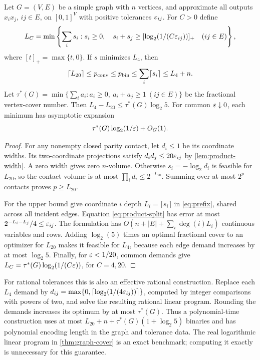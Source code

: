 \begin{theorem}\label{thm:graph-cover}
Let $G=(V,E)$ be a simple graph with $n$ vertices, and approximate all
outputs $x_ix_j$, $ij\in E$, on $[0,1]^V$ with positive tolerances
$\varepsilon_{ij}$. For $C>0$ define
\[
 L_C=\min\left\{\sum_i s_i:s_i\ge0,\quad
 s_i+s_j\ge[\log_2(1/(C\varepsilon_{ij}))]_+\quad(ij\in E)\right\},
\]
where $[t]_+=\max\{t,0\}$. If $s$ minimizes $L_4$, then
\begin{equation}\label{eq:graph-finite}
 \lceil L_{20}\rceil\le p_{\mathrm{conv}}\le p_{\mathrm{bin}}
 \le\sum_i\lceil s_i\rceil\le L_4+n.
\end{equation}
Let $\tau^*(G)=\min\{\sum_i a_i:a_i\ge0,\ a_i+a_j\ge1\ (ij\in E)\}$
be the fractional vertex-cover number. Then
$L_4-L_{20}\le\tau^*(G)\log_2 5$.
For common $\varepsilon\downarrow0$, each minimum has asymptotic expansion
\[
 \tau^*(G)\log_2(1/\varepsilon)+O_G(1).
\]
\end{theorem}
\begin{proof}
For any nonempty closed parity contact, let $d_i\le1$ be its coordinate
widths. Its two-coordinate projections satisfy
$d_id_j\le20\varepsilon_{ij}$ by \cref{lem:product-width}. A zero width gives
zero $n$-volume. Otherwise $s_i=-\log_2d_i$ is feasible for $L_{20}$,
so the contact volume is at most $\prod_i d_i\le2^{-L_{20}}$.
Summing over at most $2^p$ contacts proves $p\ge L_{20}$.

For the upper bound give coordinate $i$ depth $L_i=\lceil s_i\rceil$
in \eqref{eq:prefix}, shared across all incident edges. Equation
\eqref{eq:product-split} has error at most
$2^{-L_i-L_j}/4\le\varepsilon_{ij}$. The formulation has
$O(n+|E|+\sum_i\deg(i)L_i)$ continuous variables and rows. Adding
$\log_2(5)$ times an optimal fractional cover to an optimizer for
$L_{20}$ makes it feasible for $L_4$, because each edge demand increases
by at most $\log_2 5$. Finally, for $\varepsilon<1/20$, common demands give
$L_C=\tau^*(G)\log_2(1/(C\varepsilon))$, for $C=4,20$.
\end{proof}

For rational tolerances this is also an effective rational construction.
Replace each $L_4$ demand by
$d_{ij}=\max\{0,\lceil\log_2(1/(4\varepsilon_{ij}))\rceil\}$,
computed by integer comparisons with powers of two, and solve the
resulting rational linear program. Rounding the demands increases its
optimum by at most $\tau^*(G)$. Thus a polynomial-time construction uses
at most $L_{20}+n+\tau^*(G)(1+\log_2 5)$ binaries and has polynomial
encoding length in the graph and tolerance data. The real logarithmic
linear program in \cref{thm:graph-cover} is an exact benchmark; computing
it exactly is unnecessary for this guarantee.

